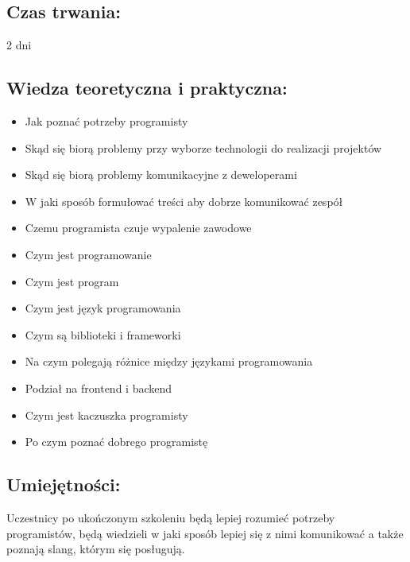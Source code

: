 \documentclass{article}[10pt]
\begin{document}
	\subsection*{Czas trwania:}
\begin{adjustwidth}{2cm}{}
	2 dni
\end{adjustwidth}

	\subsection*{Wiedza teoretyczna i praktyczna:}
\begin{adjustwidth}{1.5cm}{}
	\begin{itemize}
		\item Jak poznać potrzeby programisty
		\item Skąd się biorą problemy przy wyborze technologii do realizacji projektów
		\item Skąd się biorą problemy komunikacyjne z deweloperami
		\item W jaki sposób formułować treści aby dobrze komunikować zespół
		\item Czemu programista czuje wypalenie zawodowe
		\item Czym jest programowanie
		\item Czym jest program
		\item Czym jest język programowania
		\item Czym są biblioteki i frameworki
		\item Na czym polegają różnice między językami programowania
		\item Podział na frontend i backend
		\item Czym jest kaczuszka programisty
		\item Po czym poznać dobrego programistę
	\end{itemize}
\end{adjustwidth}

	\subsection*{Umiejętności:}
\begin{adjustwidth}{2cm}{}
\justifying
	
Uczestnicy po ukończonym szkoleniu będą lepiej rozumieć potrzeby programistów, będą wiedzieli w jaki sposób lepiej się z nimi komunikować a także poznają slang, którym się posługują. 
\end{adjustwidth}

\newpage
\end{document}
